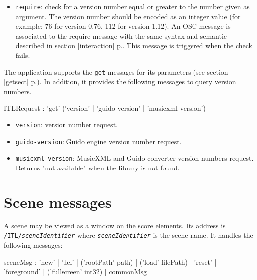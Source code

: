 \documentclass[a4paper,twoside]{report}
\newcommand{\toplevel}[1]	{\chapter{#1}}
\newcommand{\fullref}[1]	{\ref{#1} p.\pageref{#1}}
\newcommand{\OSC}[1]		{\texttt{#1}}
\begin{document}
\begin{itemize}
\item \OSC{require}: check for a version number equal or greater to the number given as argument. The version number should be encoded as an integer value (for example: 76 for version 0.76, 112 for version 1.12). An OSC message is associated to the require message with the same syntax and semantic described in section \fullref{interaction}. This message is triggered when the check fails.

\end{itemize}

The application supports the \OSC{get} messages for its parameters (see section \fullref{getsect}). In addition, it provides the following messages to query version numbers.

\begin{rail}
ITLRequest : 'get'  ('version' | 'guido-version' | 'musicxml-version')
\end{rail}

\begin{itemize}
\item \OSC{version}: version number request.
\item \OSC{guido-version}: Guido engine version number request.
\item \OSC{musicxml-version}: MusicXML and Guido converter version numbers request. Returns "not available" when the library is not found.

\end{itemize}



\toplevel{Scene messages}
\label{scene}
A scene may be viewed as a window on the score elements. Its address is \OSC{/ITL/\textit{sceneIdentifier}} where \OSC{\textit{sceneIdentifier}} is the scene name. It handles the following messages:
\begin{rail}
sceneMsg :  'new'
			| 'del'
			| ('rootPath' path) 
			| ('load' filePath)
			| 'reset'
			| 'foreground'
			| ('fullscreen' int32)
			| commonMsg
\end{rail}
\end{document}
